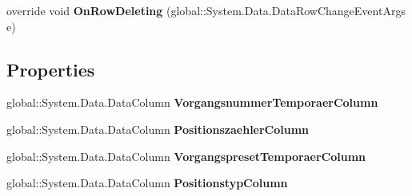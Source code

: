 \begin{DoxyCompactItemize}
\item 
override void {\bfseries On\+Row\+Deleting} (global\+::\+System.\+Data.\+Data\+Row\+Change\+Event\+Args e)\hypertarget{class_products_1_1_data_1_1ds_sage_1_1_order_detail_data_table_ad13af8811d649ccfa17febc401684c4e}{}\label{class_products_1_1_data_1_1ds_sage_1_1_order_detail_data_table_ad13af8811d649ccfa17febc401684c4e}

\end{DoxyCompactItemize}
\subsection*{Properties}
\begin{DoxyCompactItemize}
\item 
global\+::\+System.\+Data.\+Data\+Column {\bfseries Vorgangsnummer\+Temporaer\+Column}\hypertarget{class_products_1_1_data_1_1ds_sage_1_1_order_detail_data_table_ac62132980a0eb7e13defdf22189f605f}{}\label{class_products_1_1_data_1_1ds_sage_1_1_order_detail_data_table_ac62132980a0eb7e13defdf22189f605f}

\item 
global\+::\+System.\+Data.\+Data\+Column {\bfseries Positionszaehler\+Column}\hypertarget{class_products_1_1_data_1_1ds_sage_1_1_order_detail_data_table_a25619bf79ade1de94482a6013b66f6a7}{}\label{class_products_1_1_data_1_1ds_sage_1_1_order_detail_data_table_a25619bf79ade1de94482a6013b66f6a7}

\item 
global\+::\+System.\+Data.\+Data\+Column {\bfseries Vorgangspreset\+Temporaer\+Column}\hypertarget{class_products_1_1_data_1_1ds_sage_1_1_order_detail_data_table_a970dcdb20c7c2e04289d7779652b543c}{}\label{class_products_1_1_data_1_1ds_sage_1_1_order_detail_data_table_a970dcdb20c7c2e04289d7779652b543c}

\item 
global\+::\+System.\+Data.\+Data\+Column {\bfseries Positionstyp\+Column}\hypertarget{class_products_1_1_data_1_1ds_sage_1_1_order_detail_data_table_a94f62fd590b926d82b95dba61cf3801b}{}\label{class_products_1_1_data_1_1ds_sage_1_1_order_detail_data_table_a94f62fd590b926d82b95dba61cf3801b}


\end{DoxyCompactItemize}
